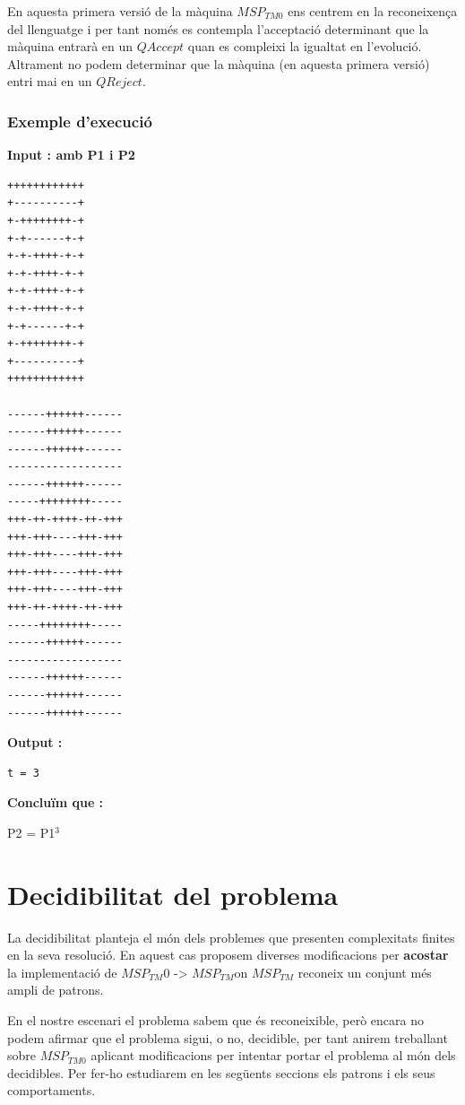 \documentclass[12pt,a4paper]{report}
\def \tm{$MSP_{TM} $}
\def \tmz{$MSP_{TM0} $}
\begin{document}
En aquesta primera versió de la màquina \tmz{} ens centrem en la reconeixença del llenguatge i per tant només es contempla l’acceptació determinant que la màquina entrarà en un $QAccept$ quan es compleixi la igualtat en l’evolució. Altrament no podem determinar que la màquina (en aquesta primera versió) entri mai en un $QReject$.

\subsubsection{Exemple d'execució}

\textbf{Input : amb P1 i P2}

\begin{lstlisting}
++++++++++++
+----------+
+-++++++++-+
+-+------+-+
+-+-++++-+-+
+-+-++++-+-+
+-+-++++-+-+
+-+-++++-+-+
+-+------+-+
+-++++++++-+
+----------+
++++++++++++

------++++++------
------++++++------
------++++++------
------------------
------++++++------
-----++++++++-----
+++-++-++++-++-+++
+++-+++----+++-+++
+++-+++----+++-+++
+++-+++----+++-+++
+++-+++----+++-+++
+++-++-++++-++-+++
-----++++++++-----
------++++++------
------------------
------++++++------
------++++++------
------++++++------

\end{lstlisting}

\textbf{Output :}

\begin{lstlisting}
t = 3
\end{lstlisting}

\textbf{Concluïm que :}

P2 = P1$^3$


\section{Decidibilitat del problema}

La decidibilitat planteja el món dels problemes que presenten complexitats finites en la seva resolució. En aquest cas proposem diverses modificacions per \textbf{acostar} la implementació de \tm0{} -> \tm on \tm{} reconeix un conjunt més ampli de patrons.

En el nostre escenari el problema sabem que és reconeixible, però encara no podem afirmar que el problema sigui, o no, decidible, per tant anirem treballant sobre \tmz{} aplicant modificacions per intentar portar el problema al món dels decidibles. Per fer-ho estudiarem en les següents seccions els patrons i els seus comportaments.
\end{document}
